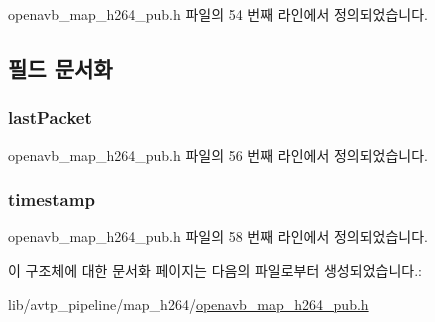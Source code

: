 openavb\+\_\+map\+\_\+h264\+\_\+pub.\+h 파일의 54 번째 라인에서 정의되었습니다.



\subsection{필드 문서화}
\subsubsection[{\texorpdfstring{last\+Packet}{lastPacket}}]{ last\+Packet}\hypertarget{structmedia__q__item__map__h264__pub__data__t_aca6f99e75a0e338faed2ee8d4cbc7dd7}{}\label{structmedia__q__item__map__h264__pub__data__t_aca6f99e75a0e338faed2ee8d4cbc7dd7}


openavb\+\_\+map\+\_\+h264\+\_\+pub.\+h 파일의 56 번째 라인에서 정의되었습니다.

\subsubsection[{\texorpdfstring{timestamp}{timestamp}}]{ timestamp}\hypertarget{structmedia__q__item__map__h264__pub__data__t_a789796b7042ad0c179aca7d160c8def8}{}\label{structmedia__q__item__map__h264__pub__data__t_a789796b7042ad0c179aca7d160c8def8}


openavb\+\_\+map\+\_\+h264\+\_\+pub.\+h 파일의 58 번째 라인에서 정의되었습니다.



이 구조체에 대한 문서화 페이지는 다음의 파일로부터 생성되었습니다.\+:\begin{DoxyCompactItemize}
\item 
lib/avtp\+\_\+pipeline/map\+\_\+h264/\hyperlink{openavb__map__h264__pub_8h}{openavb\+\_\+map\+\_\+h264\+\_\+pub.\+h}\end{DoxyCompactItemize}
